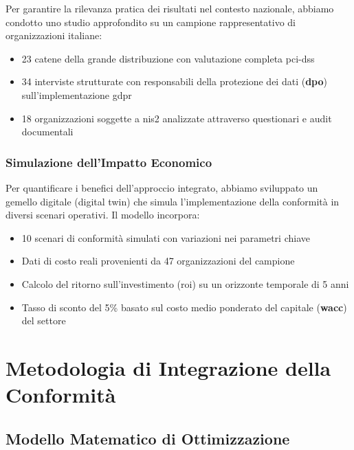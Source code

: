 Per garantire la rilevanza pratica dei risultati nel contesto nazionale, abbiamo condotto uno studio approfondito su un campione rappresentativo di organizzazioni italiane:

\begin{itemize}
    \item 23 catene della grande distribuzione con valutazione completa \gls{pci-dss}
    \item 34 interviste strutturate con responsabili della protezione dei dati (\textbf{\gls{dpo}}) sull'implementazione \gls{gdpr}
    \item 18 organizzazioni soggette a \gls{nis2} analizzate attraverso questionari e audit documentali
\end{itemize}

\subsubsection{\texorpdfstring{Simulazione dell'Impatto Economico}{4.2.2.3 - Simulazione dell'Impatto Economico}}

Per quantificare i benefici dell'approccio integrato, abbiamo sviluppato un gemello digitale (digital twin) che simula l'implementazione della conformità in diversi scenari operativi. Il modello incorpora:

\begin{itemize}
    \item 10 scenari di conformità simulati con variazioni nei parametri chiave
    \item Dati di costo reali provenienti da 47 organizzazioni del campione
    \item Calcolo del ritorno sull'investimento (\gls{roi}) su un orizzonte temporale di 5 anni
    \item Tasso di sconto del 5\% basato sul costo medio ponderato del capitale (\textbf{\gls{wacc}}) del settore
\end{itemize}

\section{\texorpdfstring{Metodologia di Integrazione della Conformità}{4.3 - Metodologia di Integrazione della Conformità}}
\label{sec:4.3_metodologia}

\subsection{\texorpdfstring{Modello Matematico di Ottimizzazione}{4.3.1 - Modello Matematico di Ottimizzazione}}
\label{subsec:4.3.1_modello}

